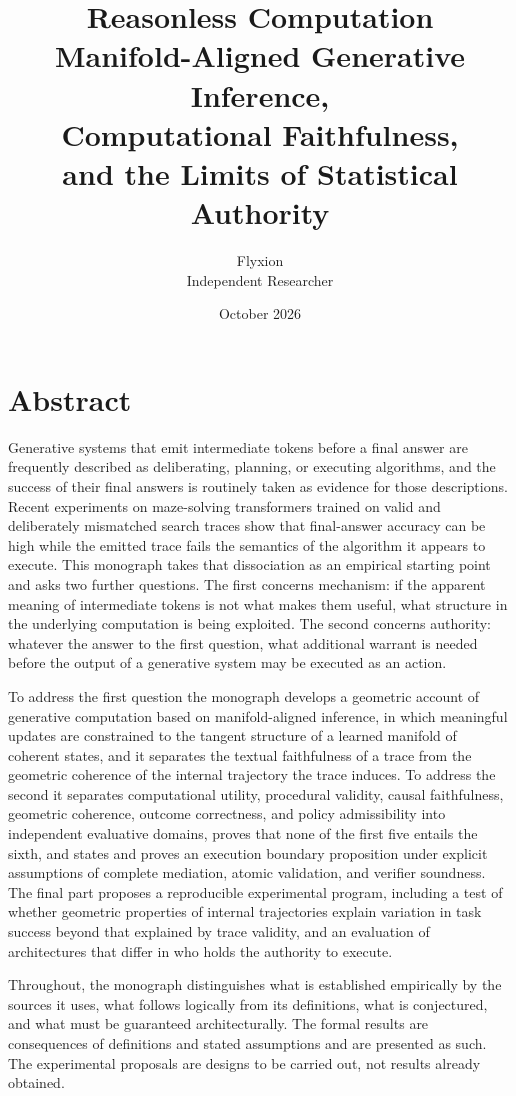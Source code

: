 \documentclass[11pt,twoside,openright]{book}
\title{%
  {\Huge\bfseries Reasonless Computation}\\[1.2ex]
  {\LARGE Manifold-Aligned Generative Inference,\\ Computational Faithfulness,\\ and the Limits of Statistical Authority}}
\author{\Large Flyxion\\[0.6ex]\normalsize Independent Researcher}
\date{October 2026}
\theoremstyle{plain}
\theoremstyle{definition}
\theoremstyle{remark}
\begin{document}
\frontmatter
\maketitle

\chapter*{Abstract}

Generative systems that emit intermediate tokens before a final answer are frequently described as deliberating, planning, or executing algorithms, and the success of their final answers is routinely taken as evidence for those descriptions. Recent experiments on maze-solving transformers trained on valid and deliberately mismatched search traces show that final-answer accuracy can be high while the emitted trace fails the semantics of the algorithm it appears to execute. This monograph takes that dissociation as an empirical starting point and asks two further questions. The first concerns mechanism: if the apparent meaning of intermediate tokens is not what makes them useful, what structure in the underlying computation is being exploited. The second concerns authority: whatever the answer to the first question, what additional warrant is needed before the output of a generative system may be executed as an action.

To address the first question the monograph develops a geometric account of generative computation based on manifold-aligned inference, in which meaningful updates are constrained to the tangent structure of a learned manifold of coherent states, and it separates the textual faithfulness of a trace from the geometric coherence of the internal trajectory the trace induces. To address the second it separates computational utility, procedural validity, causal faithfulness, geometric coherence, outcome correctness, and policy admissibility into independent evaluative domains, proves that none of the first five entails the sixth, and states and proves an execution boundary proposition under explicit assumptions of complete mediation, atomic validation, and verifier soundness. The final part proposes a reproducible experimental program, including a test of whether geometric properties of internal trajectories explain variation in task success beyond that explained by trace validity, and an evaluation of architectures that differ in who holds the authority to execute.

Throughout, the monograph distinguishes what is established empirically by the sources it uses, what follows logically from its definitions, what is conjectured, and what must be guaranteed architecturally. The formal results are consequences of definitions and stated assumptions and are presented as such. The experimental proposals are designs to be carried out, not results already obtained.
\end{document}

